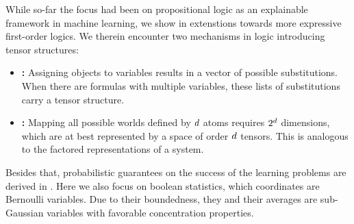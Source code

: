 While so-far the focus had been on propositional logic as an explainable framework in machine learning, we show in  extenstions towards more expressive first-order logics.
We therein encounter two mechanisms in logic introducing tensor structures:
\begin{itemize}
    \item \textbf{\SubstitutionStructure{}:} Assigning objects to variables results in a vector of possible substitutions. When there are formulas with multiple variables, these lists of substitutions carry a tensor structure.
    \item \textbf{\SemanticStructure{}:} Mapping all possible worlds defined by $d$ atoms requires $2^{d}$ dimensions, which are at best represented by a space of order $d$ tensors.
    This is analogous to the factored representations of a system.
\end{itemize}


Besides that, probabilistic guarantees on the success of the learning problems are derived in .
Here we also focus on boolean statistics, which coordinates are Bernoulli variables.
Due to their boundedness, they and their averages are sub-Gaussian variables with favorable concentration properties.